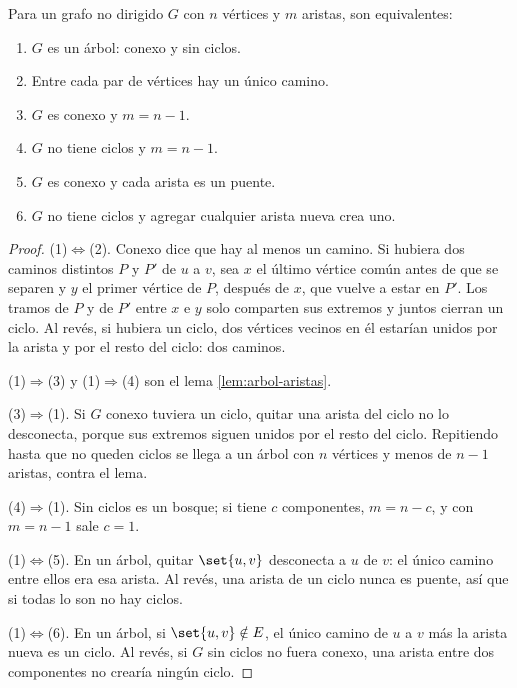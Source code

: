 \documentclass[11pt,letterpaper]{article}
\begin{document}
\begin{teorema}
  \label{teo:arbol-caracterizaciones}
  Para un grafo no dirigido $G$ con $n$ vértices y $m$ aristas, son
  equivalentes:
  \begin{enumerate}[label=(\arabic*), itemsep=0pt, parsep=0pt]
    \item $G$ es un árbol: conexo y sin ciclos.
    \item Entre cada par de vértices hay un único camino.
    \item $G$ es conexo y $m = n - 1$.
    \item $G$ no tiene ciclos y $m = n - 1$.
    \item $G$ es conexo y cada arista es un puente.
    \item $G$ no tiene ciclos y agregar cualquier arista nueva crea
          uno.
  \end{enumerate}
\end{teorema}

\begin{proof}
  (1)$\Leftrightarrow$(2). Conexo dice que hay al menos un camino. Si
  hubiera dos caminos distintos $P$ y $P'$ de $u$ a $v$, sea $x$ el
  último vértice común antes de que se separen y $y$ el primer vértice
  de $P$, después de $x$, que vuelve a estar en $P'$. Los tramos de
  $P$ y de $P'$ entre $x$ e $y$ solo comparten sus extremos y juntos
  cierran un ciclo. Al revés, si hubiera un ciclo, dos vértices
  vecinos en él estarían unidos por la arista y por el resto del
  ciclo: dos caminos.

  (1)$\Rightarrow$(3) y (1)$\Rightarrow$(4) son el lema
  \ref{lem:arbol-aristas}.

  (3)$\Rightarrow$(1). Si $G$ conexo tuviera un ciclo, quitar una
  arista del ciclo no lo desconecta, porque sus extremos siguen unidos
  por el resto del ciclo. Repitiendo hasta que no queden ciclos se
  llega a un árbol con $n$ vértices y menos de $n - 1$ aristas,
  contra el lema.

  (4)$\Rightarrow$(1). Sin ciclos es un bosque; si tiene $c$
  componentes, $m = n - c$, y con $m = n - 1$ sale $c = 1$.

  (1)$\Leftrightarrow$(5). En un árbol, quitar $\set{u, v}$ desconecta
  a $u$ de $v$: el único camino entre ellos era esa arista. Al revés,
  una arista de un ciclo nunca es puente, así que si todas lo son no
  hay ciclos.

  (1)$\Leftrightarrow$(6). En un árbol, si $\set{u, v} \notin E$, el
  único camino de $u$ a $v$ más la arista nueva es un ciclo. Al
  revés, si $G$ sin ciclos no fuera conexo, una arista entre dos
  componentes no crearía ningún ciclo.
\end{proof}
\end{document}
